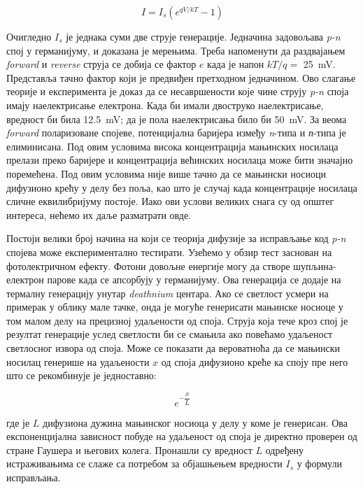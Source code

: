 \documentclass{article}
\begin{document}
\begin{equation}
	I = I_s(e^{qV/kT}-1)
\end{equation}


Очигледно $I_s$ је једнака суми две струје генерације. Једначина задовољава \textit{p-n} спој у германијуму, и доказана је мерењима. Треба напоменути да раздвајањем \textit{forward} и \textit{reverse} струја се добија се фактор $e$ када је напон $kT/q=$ \SI{25}{\milli\volt}. Представља тачно фактор који је предвиђен претходном једначином. Ово слагање теорије и експеримента је доказ да се несавршености које чине струју \textit{p-n} споја имају наелектрисање електрона. Када би имали двоструко наелектрисање, вредност би била \SI{12.5}{\milli\volt}; да је пола наелектрисања било би \SI{50}{\milli\volt}. За веома \textit{forward} поларизоване спојеве, потенцијална баријера између \textit{n}-типа и \textit{п}-типа је елиминисана. Под овим условима висока концентрација мањинских носилаца прелази преко баријере и концентрација већинских носилаца може бити значајно поремећена. Под овим условима није више тачно да се мањински носиоци дифузионо крећу у делу без поља, као што је случај када  концентрације носилаца сличне еквилибријуму постоје. Иако ови услови великих снага су од општег интереса, нећемо их даље разматрати овде.

Постоји велики број начина на који се теорија дифузије за исправљање код \textit{p-n} спојева може експериментално тестирати. Узећемо у обзир тест заснован на фотолектричном ефекту. Фотони довољне енергије могу да створе шупљина-електрон парове када се апсорбују у германијуму. Ова генерација се додаје на термалну генерацију унутар \textit{deathnium} центара. Ако се светлост усмери на примерак у облику мале тачке, онда је могуће генерисати мањинске носиоце у том малом делу на прецизној удаљености од споја. Струја која тече кроз спој је резултат генерације услед светлости би се смањила ако повећамо удаљеност светлосног извора од споја. Може се показати да вероватноћа да се мањински носилац генерише на удаљености $x$ од споја дифузионо креће ка споју пре него што се рекомбинује је једноставно:

\begin{equation}
	e^{-\dfrac{x}{L}}
\end{equation}

где је $L$ дифузиона дужина мањинског носиоца у делу у коме је генерисан. Ова експоненцијална зависност побуде на удаљеност од споја је директно проверен од стране Гаушера и његових колега. Пронашли су вредност $L$ одређену истраживањима се слаже са потребом за објашњењем вредности $I_s$ у формули исправљања.
\end{document}
